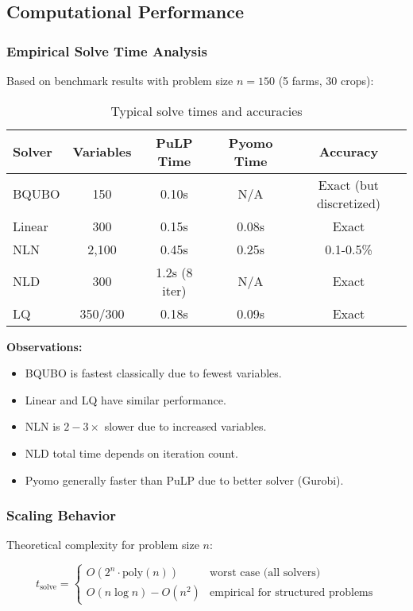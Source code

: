 \documentclass[11pt,a4paper]{article}
\begin{document}
\subsection{Computational Performance}

\subsubsection{Empirical Solve Time Analysis}

Based on benchmark results with problem size $n = 150$ (5 farms, 30 crops):

\begin{table}[h]
\centering
\caption{Typical solve times and accuracies}
\label{tab:performance}
\begin{tabular}{lcccc}
\toprule
\textbf{Solver} & \textbf{Variables} & \textbf{PuLP Time} & \textbf{Pyomo Time} & \textbf{Accuracy} \\
\midrule
BQUBO & 150 & 0.10s & N/A & Exact (but discretized) \\
Linear & 300 & 0.15s & 0.08s & Exact \\
NLN & 2,100 & 0.45s & 0.25s & 0.1-0.5\% \\
NLD & 300 & 1.2s (8 iter) & N/A & Exact \\
LQ & 350/300 & 0.18s & 0.09s & Exact \\
\bottomrule
\end{tabular}
\end{table}

\textbf{Observations:}
\begin{itemize}
    \item BQUBO is fastest classically due to fewest variables.
    \item Linear and LQ have similar performance.
    \item NLN is $2-3\times$ slower due to increased variables.
    \item NLD total time depends on iteration count.
    \item Pyomo generally faster than PuLP due to better solver (Gurobi).
\end{itemize}

\subsubsection{Scaling Behavior}

Theoretical complexity for problem size $n$:

\begin{equation}
t_{\text{solve}} = \begin{cases}
O(2^n \cdot \text{poly}(n)) & \text{worst case (all solvers)}\\
O(n \log n) - O(n^2) & \text{empirical for structured problems}
\end{cases}
\end{equation}
\end{document}
